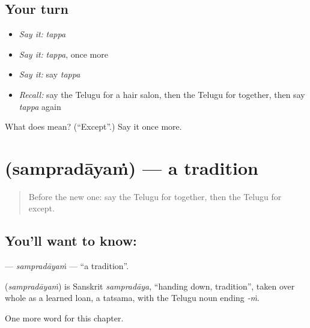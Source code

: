 \subsection*{Your turn}
\begin{itemize}
\raggedright
  \item \emph{Say it:} \emph{tappa}
  \item \emph{Say it:} \emph{tappa}, once more
  \item \emph{Say it:} say \emph{tappa}
  \item \emph{Recall:} say the Telugu for a hair salon, then the Telugu for together, then say \emph{tappa} again
\end{itemize}

\begin{tcolorbox}[breakable,colback=teal!4,colframe=teal!35!black,title={Before you move on}]
What does  mean? (\textquotedblleft{}Except\textquotedblright{}.) Say it once more.
\end{tcolorbox}
\section[\texorpdfstring{\te{సంప్రదాయం} (sampradāyaṁ)}{సంప్రదాయం (sampradāyaṁ)}]{ (sampradāyaṁ) — a tradition}

\label{lesson:TE-C217-sampradayam}



\begin{quote}
Before the new one: say the Telugu for together, then the Telugu for except.
\end{quote}

\subsection*{You'll want to know: }
\textbf{} — \emph{sampradāyaṁ} — \textquotedblleft{}a tradition\textquotedblright{}.

\begin{cousinweb}
\textbf{} (\emph{sampradāyaṁ}) is Sanskrit \emph{sampradāya}, \textquotedblleft{}handing down, tradition\textquotedblright{}, taken over whole as a learned loan, a tatsama, with the Telugu noun ending \emph{-ṁ}.
\end{cousinweb}

\begin{grammarlens}[title={What you've built}]
One more word for this chapter.
\end{grammarlens}

